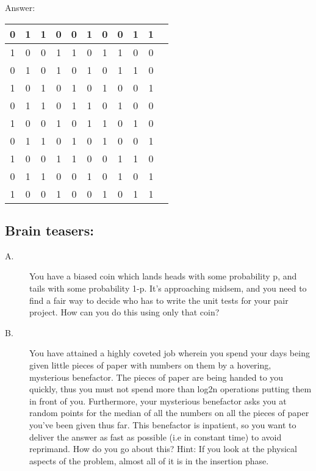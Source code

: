 \documentclass{article}
\begin{document}
Answer:
\begin{table}[ht]
\centering
\begin{tabular}{|c|c|c|c|c|c|c|c|c|c|c|}
\hline 0 & 1 & 1 & 0 & 0 & 1 & 0 & 0 & 1 & 1 \\ 
\hline 1 & 0 & 0 & 1 & 1 & 0 & 1 & 1 & 0 & 0 \\ 
\hline 0 & 1 & 0 & 1 & 0 & 1 & 0 & 1 & 1 & 0 \\ 
\hline 1 & 0 & 1 & 0 & 1 & 0 & 1 & 0 & 0 & 1 \\ 
\hline 0 & 1 & 1 & 0 & 1 & 1 & 0 & 1 & 0 & 0 \\ 
\hline 1 & 0 & 0 & 1 & 0 & 1 & 1 & 0 & 1 & 0 \\ 
\hline 0 & 1 & 1 & 0 & 1 & 0 & 1 & 0 & 0 & 1 \\ 
\hline 1 & 0 & 0 & 1 & 1 & 0 & 0 & 1 & 1 & 0 \\ 
\hline 0 & 1 & 1 & 0 & 0 & 1 & 0 & 1 & 0 & 1 \\ 
\hline 1 & 0 & 0 & 1 & 0 & 0 & 1 & 0 & 1 & 1 \\
\hline
\end{tabular}
\end{table} 


\subsection*{Brain teasers:}
\begin{description}
\item[A.] You have a biased coin which lands heads with some probability p, and tails with some probability 1-p. It’s approaching midsem, and you need to find a fair way to decide who has to write the unit tests for your pair project. How can you do this using only that coin? %

\item[B.] You have attained a highly coveted job wherein you spend your days being given little pieces of paper with numbers on them by a hovering, mysterious benefactor. The pieces of paper are being handed to you quickly, thus you must not spend more than log2n operations putting them in front of you. Furthermore, your mysterious benefactor asks you at random points for the median of all the numbers on all the pieces of paper you've been given thus far. This benefactor is inpatient, so you want to deliver the answer as fast as possible (i.e in constant time) to avoid reprimand. How do you go about this? %
Hint: If you look at the physical aspects of the problem, almost all of it is in the insertion phase.

\end{description}
\end{document}
